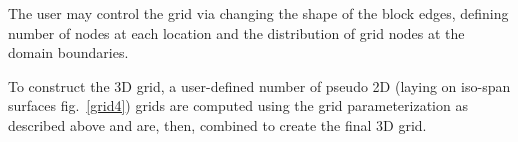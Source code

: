 The user may control the grid via changing the shape of the block edges, defining number of nodes at each location %
 and the distribution of grid nodes at the domain boundaries.%




To construct the 3D grid, a user-defined number of pseudo 2D (laying on iso-span surfaces fig.\ \ref{grid4}) grids are computed using the grid parameterization as described above and are, then, combined to create the final 3D grid.

